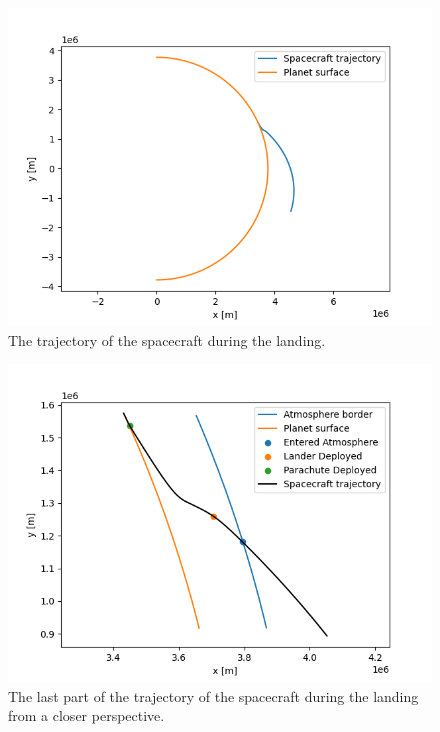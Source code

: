 \documentclass[reprint,english,notitlepage]{revtex4-2}
\begin{document}
\begin{figure}[h]
    \centering
    \includegraphics[scale=0.15]{Figures/landing_far}
    \caption{The trajectory of the spacecraft during the landing.}\label{fig:landing_far}
\end{figure}

\begin{figure}[h]
    \centering
    \includegraphics[scale=0.15]{Figures/landing_close}
    \caption{The last part of the trajectory of the spacecraft during the landing from a closer perspective.}\label{fig:landing_close}
\end{figure}
\end{document}
